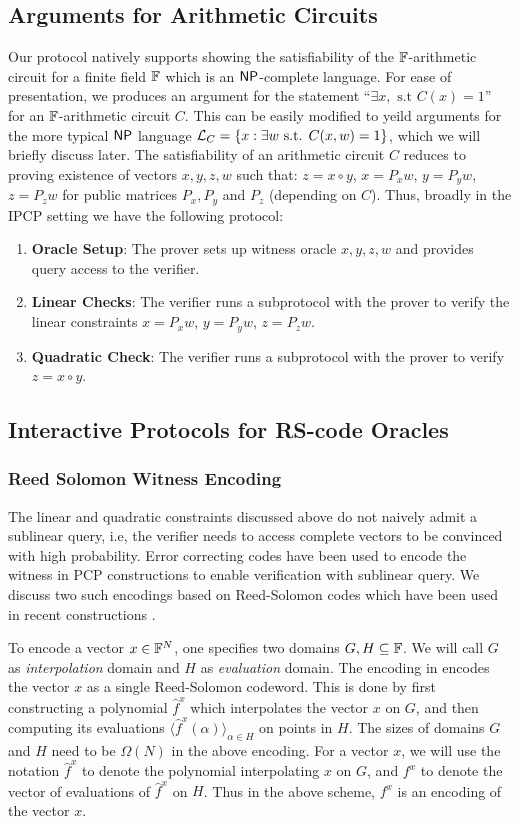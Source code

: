 \subsection{Arguments for Arithmetic Circuits}
Our protocol natively supports showing the 
satisfiability of the $\mathbb{F}$-arithmetic circuit for a finite field $\mathbb{F}$ which
is an $\mathsf{NP}$-complete language. For ease of presentation, we produces an argument for the
statement ``$\exists x, \text{ s.t } C(x)=1$'' for an $\mathbb{F}$-arithmetic circuit
$C$. This can be easily modified to
yeild arguments for the more typical $\mathsf{NP}$ language $\mathcal{L}_C = \{x:\exists w
\text{ s.t. } C(x,w)=1\}$, which we will briefly discuss later. The
satisfiability of an arithmetic circuit $C$ reduces to proving existence of
vectors $x,y,z,w$ such that:
$z = x\circ y$,
$x = P_x w$,
$y = P_y w$,
$z = P_z w$ for public matrices $P_x,P_y$ and $P_z$ (depending on
$C$). Thus, broadly in the IPCP setting we have the following protocol:
\begin{enumerate}
\item {\bf Oracle Setup}: The prover sets up witness oracle
$x,y,z,w$ and provides query access to the verifier. 
\item {\bf Linear Checks}: The verifier runs a subprotocol with the prover to verify
the linear constraints $x=P_x w$, $y=P_y w$, $z=P_z w$.
\item {\bf Quadratic Check}: The verifier runs a subprotocol with the prover to
verify $z=x\circ y$.
\end{enumerate}

\subsection{Interactive Protocols for RS-code Oracles}
\subsubsection{Reed Solomon Witness Encoding}
The linear and quadratic constraints discussed above do not naively admit a
sublinear query, i.e, the verifier needs to access complete vectors to
be convinced with high probability. Error correcting codes have been used to
encode the witness in PCP constructions to enable verification with sublinear
query. We discuss two such encodings based on Reed-Solomon codes which have
been used in recent constructions \cite{Ligero2017,Aurora,STARK2019}.

To encode a vector $x\in \mathbb{F}^N$, one specifies two domains $G,H\subseteq \mathbb{F}$.
We will call $G$ as {\em interpolation} domain and $H$ as {\em evaluation} domain.
The encoding in \cite{Aurora} encodes the vector $x$ as a single Reed-Solomon
codeword. This is done by first constructing a polynomial $\hat{f}^x$ which
interpolates the vector $x$ on $G$, and then computing its evaluations
$\langle \hat{f}^x(\alpha) \rangle_{\alpha\in H}$ on points in $H$. The sizes
of domains $G$ and $H$ need to be $\Omega(N)$ in the above encoding. For a
vector $x$, we will use the notation $\hat{f}^x$ to denote the polynomial
interpolating $x$ on $G$, and $f^x$ to denote the vector of evaluations of
$\hat{f}^x$ on $H$. Thus in the above scheme, $f^x$ is an encoding of the
vector $x$.


